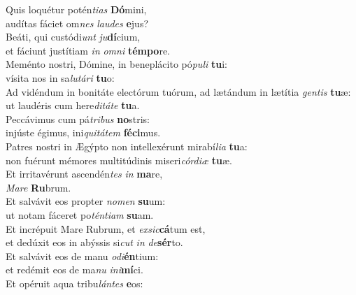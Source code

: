 \evenverse Quis loquétur potén\textit{ti}\textit{as} \textbf{Dó}mini,~\*\\
\evenverse audítas fáciet om\textit{nes} \textit{lau}\textit{des} \textbf{e}jus?\\
\oddverse Beáti, qui custódi\textit{unt} \textit{ju}\textbf{dí}cium,~\*\\
\oddverse et fáciunt justítiam \textit{in} \textit{om}\textit{ni} \textbf{tém}\textbf{po}re.\\
\evenverse Meménto nostri, Dómine, in beneplácito pó\textit{pu}\textit{li} \textbf{tu}i:~\*\\
\evenverse vísita nos in sa\textit{lu}\textit{tá}\textit{ri} \textbf{tu}o:\\
\oddverse Ad vidéndum in bonitáte electórum tuórum, ad lætándum in lætítia \textit{gen}\textit{tis} \textbf{tu}æ:~\*\\
\oddverse ut laudéris cum here\textit{di}\textit{tá}\textit{te} \textbf{tu}a.\\
\evenverse Peccávimus cum pá\textit{tri}\textit{bus} \textbf{no}stris:~\*\\
\evenverse injúste égimus, ini\textit{qui}\textit{tá}\textit{tem} \textbf{fé}\textbf{ci}mus.\\
\oddverse Patres nostri in Ægýpto non intellexérunt mirabí\textit{li}\textit{a} \textbf{tu}a:~\*\\
\oddverse non fuérunt mémores multitúdinis miseri\textit{cór}\textit{di}\textit{æ} \textbf{tu}æ.\\
\evenverse Et irritavérunt ascendén\textit{tes} \textit{in} \textbf{ma}re,~\*\\
\evenverse \textit{Ma}\textit{re} \textbf{Ru}brum.\\
\oddverse Et salvávit eos propter \textit{no}\textit{men} \textbf{su}um:~\*\\
\oddverse ut notam fáceret po\textit{tén}\textit{ti}\textit{am} \textbf{su}am.\\
\evenverse Et incrépuit Mare Rubrum, et \textit{ex}\textit{sic}\textbf{cá}tum est,~\*\\
\evenverse et dedúxit eos in abýssis si\textit{cut} \textit{in} \textit{de}\textbf{sér}to.\\
\oddverse Et salvávit eos de manu \textit{o}\textit{di}\textbf{én}tium:~\*\\
\oddverse et redémit eos de ma\textit{nu} \textit{i}\textit{ni}\textbf{mí}ci.\\
\evenverse Et opéruit aqua tribu\textit{lán}\textit{tes} \textbf{e}os:~\*\\
